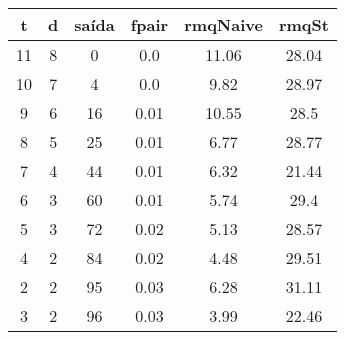 \begin{tabular}{|c|c|c|c|c|c|}
\hline
\textbf{t} & \textbf{d} & \textbf{saída} & \textbf{fpair} & \textbf{rmqNaive} & \textbf{rmqSt}\\
\hline
11 & 8 & 0 & 0.0 & 11.06 & 28.04\\
\hline
10 & 7 & 4 & 0.0 & 9.82 & 28.97\\
\hline
9 & 6 & 16 & 0.01 & 10.55 & 28.5\\
\hline
8 & 5 & 25 & 0.01 & 6.77 & 28.77\\
\hline
7 & 4 & 44 & 0.01 & 6.32 & 21.44\\
\hline
6 & 3 & 60 & 0.01 & 5.74 & 29.4\\
\hline
5 & 3 & 72 & 0.02 & 5.13 & 28.57\\
\hline
4 & 2 & 84 & 0.02 & 4.48 & 29.51\\
\hline
2 & 2 & 95 & 0.03 & 6.28 & 31.11\\
\hline
3 & 2 & 96 & 0.03 & 3.99 & 22.46\\
\hline
\end{tabular}
